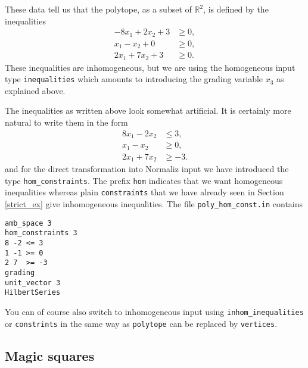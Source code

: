 \documentclass[12pt,a4paper]{scrartcl}
\theoremstyle{definition}
\def\RR{{\mathbb R}}
\begin{document}
These data tell us that the polytope, as a subset of $\RR^2$, is defined by the inequalities
\begin{align*}
	-8x_1+2x_2+3&\ge0,\\
	x_1-x_2+0&\ge0,\\
	2x_1+7x_2+3&\ge 0.
\end{align*}
These inequalities are inhomogeneous, but we are using the homogeneous input type \verb|inequalities| which amounts to introducing the grading variable $x_3$ as explained above.


The inequalities as written above look somewhat artificial. It is certainly more natural to write them in the form
\begin{align*}
8x_1-2x_2&\le 3,\\
x_1-x_2&\ge0,\\
2x_1+7x_2&\ge -3.
\end{align*}
and for the direct transformation into Normaliz input we have introduced the type \verb|hom_constraints|. The prefix \verb|hom| indicates that we want homogeneous inequalities whereas plain \verb|constraints|  that we have already seen in Section \ref{strict_ex} give inhomogeneous inequalities. The file \verb|poly_hom_const.in| contains
\begin{Verbatim}
amb_space 3
hom_constraints 3
8 -2 <= 3
1 -1 >= 0
2 7  >= -3
grading
unit_vector 3
HilbertSeries
\end{Verbatim}

You can of course also switch to inhomogeneous input using \verb|inhom_inequalities| or \verb|constrints| in the same way as \verb|polytope| can be replaced by \verb|vertices|.

\subsection{Magic squares}\label{eq_ex}
\end{document}
